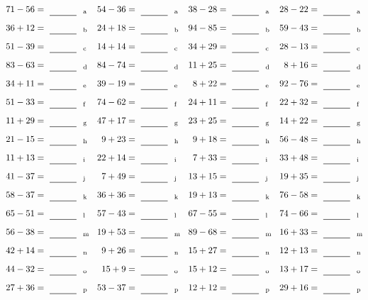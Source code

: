 \documentclass
[
  draft    = true,
  fontsize = 11pt,
  parskip  = half-
]
{scrartcl}
\begin{document}
\clearpage
\begin{align*}
    \pline{71-56}&=\rline{a}
  & \pline{54-36}&=\rline{a}
  & \pline{38-28}&=\rline{a}
  & \pline{28-22}&=\rline{a} \\[1ex]
    \pline{36+12}&=\rline{b}
  & \pline{24+18}&=\rline{b}
  & \pline{94-85}&=\rline{b}
  & \pline{59-43}&=\rline{b} \\[1ex]
    \pline{51-39}&=\rline{c}
  & \pline{14+14}&=\rline{c}
  & \pline{34+29}&=\rline{c}
  & \pline{28-13}&=\rline{c} \\[1ex]
    \pline{83-63}&=\rline{d}
  & \pline{84-74}&=\rline{d}
  & \pline{11+25}&=\rline{d}
  & \pline{8+16}&=\rline{d} \\[1ex]
    \pline{34+11}&=\rline{e}
  & \pline{39-19}&=\rline{e}
  & \pline{8+22}&=\rline{e}
  & \pline{92-76}&=\rline{e} \\[1ex]
    \pline{51-33}&=\rline{f}
  & \pline{74-62}&=\rline{f}
  & \pline{24+11}&=\rline{f}
  & \pline{22+32}&=\rline{f} \\[1ex]
    \pline{11+29}&=\rline{g}
  & \pline{47+17}&=\rline{g}
  & \pline{23+25}&=\rline{g}
  & \pline{14+22}&=\rline{g} \\[1ex]
    \pline{21-15}&=\rline{h}
  & \pline{9+23}&=\rline{h}
  & \pline{9+18}&=\rline{h}
  & \pline{56-48}&=\rline{h} \\[1ex]
    \pline{11+13}&=\rline{i}
  & \pline{22+14}&=\rline{i}
  & \pline{7+33}&=\rline{i}
  & \pline{33+48}&=\rline{i} \\[1ex]
    \pline{41-37}&=\rline{j}
  & \pline{7+49}&=\rline{j}
  & \pline{13+15}&=\rline{j}
  & \pline{19+35}&=\rline{j} \\[1ex]
    \pline{58-37}&=\rline{k}
  & \pline{36+36}&=\rline{k}
  & \pline{19+13}&=\rline{k}
  & \pline{76-58}&=\rline{k} \\[1ex]
    \pline{65-51}&=\rline{l}
  & \pline{57-43}&=\rline{l}
  & \pline{67-55}&=\rline{l}
  & \pline{74-66}&=\rline{l} \\[1ex]
    \pline{56-38}&=\rline{m}
  & \pline{19+53}&=\rline{m}
  & \pline{89-68}&=\rline{m}
  & \pline{16+33}&=\rline{m} \\[1ex]
    \pline{42+14}&=\rline{n}
  & \pline{9+26}&=\rline{n}
  & \pline{15+27}&=\rline{n}
  & \pline{12+13}&=\rline{n} \\[1ex]
    \pline{44-32}&=\rline{o}
  & \pline{15+9}&=\rline{o}
  & \pline{15+12}&=\rline{o}
  & \pline{13+17}&=\rline{o} \\[1ex]
    \pline{27+36}&=\rline{p}
  & \pline{53-37}&=\rline{p}
  & \pline{12+12}&=\rline{p}
  & \pline{29+16}&=\rline{p}
\end{align*}
\end{document}
